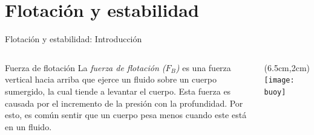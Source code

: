 \documentclass [xcolor=svgnames, t] {beamer}
\begin{document}
\section{Flotaci\'on y estabilidad}
\begin{frame}{Flotaci\'on y estabilidad: Introducci\'on}
\begin{columns}
\begin{block}{Fuerza de flotaci\'on}
La \emph{fuerza de flotaci\'on ($F_B$)} es una fuerza vertical hacia arriba que ejerce un fluido sobre un cuerpo sumergido, la cual tiende a levantar el cuerpo. Esta fuerza es causada por el incremento de la presi\'on con la profundidad. Por esto, es com\'un sentir que un cuerpo pesa menos cuando este est\'a en un fluido.
\end{block}
\begin{textblock*}{6cm}(6.5cm,2cm) %
\texttt{[image: buoy]}
\end{textblock*}
\end{columns}
\end{frame}
\end{document}
